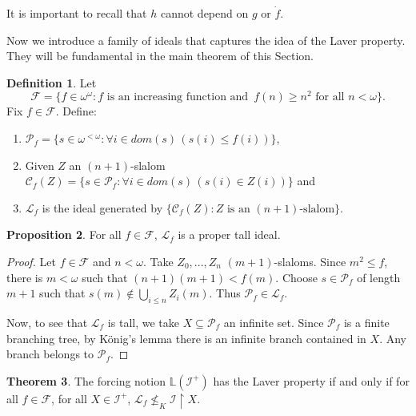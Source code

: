 \documentclass{amsart}
\theoremstyle{definition}
\newtheorem{theorem}{Theorem}[section]
\newtheorem{definition}[theorem]{Definition}
\newtheorem{proposition}[theorem]{Proposition}
\theoremstyle{remark}
\numberwithin{equation}{section}
\newcommand{\lf}{\mathcal{L}_f}
\begin{document}
It is important to recall that $h$ cannot depend on $g$ or $\dot f$.

Now we introduce a family of ideals that captures the idea of the Laver property. They will be fundamental in the main theorem of this Section.

\begin{definition}
    Let 
    \[
    \mathcal{F}=\{f\in\omega^\omega: f \text{ is an increasing function and } \, f(n)\geq n^2 \text{ for all }n<\omega\}.
    \]
    Fix $f\in\mathcal{F}$. Define:
    \begin{enumerate}
        \item $\mathcal{P}_f=\{s\in \omega^{<\omega}: \forall i\in dom(s)\, (s(i)\leq f(i))\}$,
        \item Given $Z$ an $(n+1)$-slalom $\mathcal{C}_f(Z)=\{s\in \mathcal{P}_f:\forall i\in dom(s)\, (s(i)\in Z(i))\}$ and
        \item $\mathcal{L}_f$ is the ideal generated by $\{\mathcal{C}_f(Z): Z \text{ is an }(n+1)\text{-slalom}\}$.
    \end{enumerate}
\end{definition}

\begin{proposition}
    For all $f\in \mathcal{F}$, $\mathcal{L}_f$ is a proper tall ideal.
\end{proposition}
\begin{proof}
    Let $f\in\mathcal{F}$ and $n<\omega$. Take $Z_0,...,Z_n$ $(m+1)$-slaloms. Since $m^2\leq f$, there is $m<\omega$ such that $(n+1)(m+1)<f(m)$. Choose $s\in \mathcal{P}_f$ of length $m+1$ such that $s(m)\notin \bigcup_{i\leq n} Z_i(m)$. Thus $\mathcal{P}_f\in \lf$.

    Now, to see that $\lf$ is tall, we take $X\subseteq \mathcal{P}_f$ an infinite set. Since $\mathcal{P}_f$ is a finite branching tree, by König's lemma there is an infinite branch contained in $X$. Any branch belongs to $\mathcal{P}_f$.
\end{proof}


\begin{theorem}\label{Laver property}
    The forcing notion $\mathbb{L}(\mathcal{I}^+)$ has the Laver property if and only if for all $f\in\mathcal{F}$, for all $X\in\mathcal{I}^+$, $\mathcal{L}_f\not\leq_{K}\mathcal{I}\upharpoonright X$.
\end{theorem}
\end{document}
